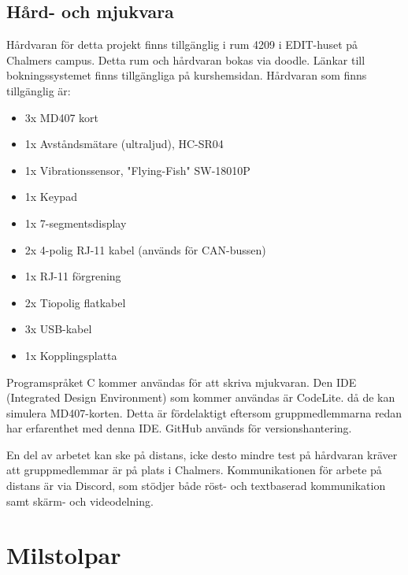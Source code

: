 \documentclass[a4paper]{article}
\begin{document}
\subsection{Hård- och mjukvara}

Hårdvaran för detta projekt finns tillgänglig i rum 4209 i EDIT-huset på Chalmers campus. Detta rum och hårdvaran bokas via doodle. Länkar till bokningssystemet finns tillgängliga på kurshemsidan. Hårdvaran som finns tillgänglig är:

\begin{itemize}
    \item 3x MD407 kort
    \item 1x Avståndsmätare (ultraljud), HC-SR04
    \item 1x Vibrationssensor, "Flying-Fish" SW-18010P
    \item 1x Keypad
    \item 1x 7-segmentsdisplay
    \item 2x 4-polig RJ-11 kabel (används för CAN-bussen)
    \item 1x RJ-11 förgrening
    \item 2x Tiopolig flatkabel
    \item 3x USB-kabel
    \item 1x Kopplingsplatta
\end{itemize}

Programspråket C kommer användas för att skriva mjukvaran. Den IDE (Integrated Design Environment) som kommer användas är CodeLite. då de kan simulera MD407-korten. Detta är fördelaktigt eftersom gruppmedlemmarna redan har erfarenthet med denna IDE. GitHub används för versionshantering.

En del av arbetet kan ske på distans, icke desto mindre test på hårdvaran kräver att gruppmedlemmar är på plats i Chalmers. Kommunikationen för arbete på distans är via Discord, som stödjer både röst- och textbaserad kommunikation samt skärm- och videodelning.

\section{Milstolpar}
\end{document}
